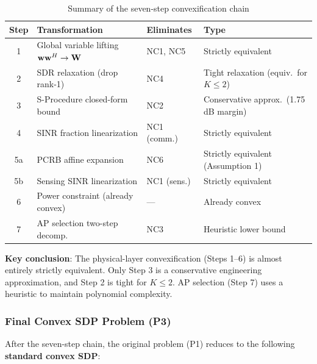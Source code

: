 \begin{table}[htbp]
\centering
\caption{Summary of the seven-step convexification chain}\label{tab:convex_chain}
\begin{tabular}{clll}
\toprule
Step & Transformation & Eliminates & Type \\
\midrule
1 & Global variable lifting $\mathbf{w}\mathbf{w}^H \to \mathbf{W}$ & NC1, NC5 & Strictly equivalent \\
2 & SDR relaxation (drop rank-1) & NC4 & Tight relaxation (equiv.\ for $K\leq 2$) \\
3 & S-Procedure closed-form bound & NC2 & Conservative approx.\ (1.75 dB margin) \\
4 & SINR fraction linearization & NC1 (comm.) & Strictly equivalent \\
5a & PCRB affine expansion & NC6 & Strictly equivalent (Assumption 1) \\
5b & Sensing SINR linearization & NC1 (sens.) & Strictly equivalent \\
6 & Power constraint (already convex) & --- & Already convex \\
7 & AP selection two-step decomp. & NC3 & Heuristic lower bound \\
\bottomrule
\end{tabular}
\end{table}

\textbf{Key conclusion}: The physical-layer convexification (Steps 1--6) is almost entirely strictly equivalent. Only Step 3 is a conservative engineering approximation, and Step 2 is tight for $K \leq 2$. AP selection (Step 7) uses a heuristic to maintain polynomial complexity.

\subsubsection{Final Convex SDP Problem (P3)}

After the seven-step chain, the original problem (P1) reduces to the following \textbf{standard convex SDP}:

